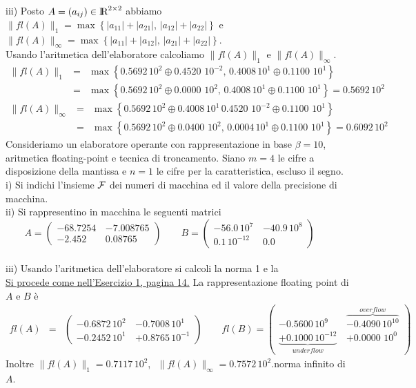 \documentclass[11pt]{article}
\def\R{\hbox{\rm I\kern-.2em\hbox{\rm R}}}
\def\ee{\`e }
\begin{document}
\vskip 10pt
\noindent
iii) Posto $A=(a_{ij})\in \R^{2\times 2}$  abbiamo
$\|fl(A)\|_1=\max\left\{|a_{11}|+|a_{21}|,\, |a_{12}|+|a_{22}| \right\} $
e $\|fl(A)\|_{\infty}=\max\left\{|a_{11}|+|a_{12}|,\, |a_{21}|+|a_{22}| \right\}$.
\\
Usando l'aritmetica dell'elaboratore calcoliamo $\|fl(A)\|_1$ e $\|fl(A)\|_{\infty}$.
\begin{eqnarray}
\|fl(A)\|_1&=&\max \left\{0.5692\, 10^2 \oplus 0.4520\, \,10^{-2},\, 0.4008\, 10^1 \oplus 0.1100 \, \, 10^1   \right\}
\\ \nonumber
& =& \max\left\{0.5692\, 10^2 \oplus 0.0000\, \,10^{2},\,0.4008\, 10^1 \oplus 0.1100 \, \, 10^1   \right\} =0.5692\, 10^2
\end{eqnarray}
\begin{eqnarray}
\|fl(A)\|_\infty&=&\max \left\{0.5692\, 10^2 \oplus 0.4008 \, 10^1 \, 0.4520\, \,10^{-2}  \oplus 0.1100 \, \, 10^1   \right\}
\\ \nonumber
& =& \max\left\{0.5692\, 10^2 \oplus 0.0400\, \,10^{2},\,0.0004\, 10^1 \oplus 0.1100 \, \, 10^1   \right\} =0.6092\, 10^2
\end{eqnarray}
\vskip 20pt  
Consideriamo un elaboratore operante con
rappresentazione in base $\beta=10$, aritmetica floating-point e
tecnica di troncamento. Siano  $m=4$ le cifre a disposizione della mantissa
e  $n=1$ le cifre per la  caratteristica, escluso il segno.
\\
i) Si indichi l'insieme ${\cal F}$ dei numeri di macchina ed il valore della precisione di macchina.
\\
ii) Si  rappresentino in macchina   le seguenti matrici
$$
A=
\left(
\begin{array}{rr}
-68.7254 \, & -7.008765\\
-2.452 \,&  0.08765
\end{array}
\right)
\quad \quad
B=
\left(
\begin{array}{rr}
-56.0\, 10^7 \,& -40.9\, 10^8\\
0.1\, 10^{-12} \,&  0.0
\end{array}
\right)
\quad \quad
$$
\\
iii)
Usando l'aritmetica dell'elaboratore  si calcoli la norma 1 e la 
\medskip {}
\\
\underline{Si procede come nell'Esercizio 1, pagina 14.}
La rappresentazione floating point di $A$ e $B$ \ee
\begin{eqnarray}
fl(A)&=&
\left(
\begin{array}{ll}
-0.6872\, 10^2 \,& -0.7008\, 10^1\\
-0.2452\, 10^{1}  \,&  +0.8765 \, 10^{-1}
\end{array}
\right)
\quad \quad
fl(B)= \left(
\begin{array}{ll}
-0.5600\, 10^9\, & \overbrace{-0.4090\, 10^{10}}^{overflow} \\
\underbrace{+0.1000\, 10^{-12}  }_{underflow}\,&  +0.0000\,\,10^0
\end{array}
\right)   \nonumber
\end{eqnarray}
\vskip 10pt \noindent
Inoltre $\|fl(A)\|_1=0.7117\, 10^2$,  $\,\,\|fl(A)\|_\infty =0.7572\, 10^2$.norma infinito di $A$.
\medskip \noindent 
\medskip  \medskip\medskip\noindent

\vskip 20pt
\noindent

\vskip 30pt
\noindent
\end{document}
